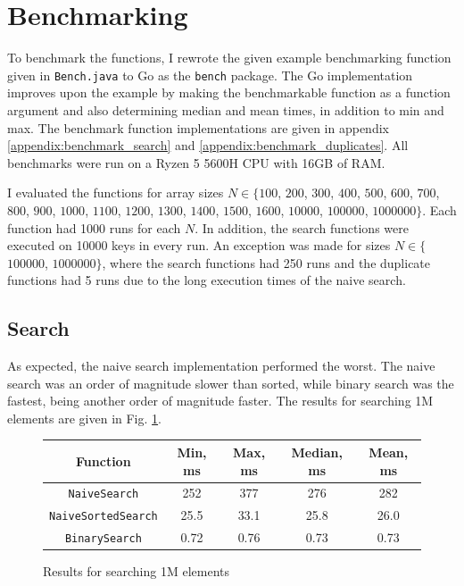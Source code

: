 \documentclass[a4paper,11pt]{article}
\begin{document}
    \section*{Benchmarking}

    To benchmark the functions, I rewrote the given example benchmarking function given in \texttt{Bench.java} to Go as the \texttt{bench} package. The Go implementation improves upon the example by making the benchmarkable function as a function argument and also determining median and mean times, in addition to min and max. The benchmark function implementations are given in appendix \ref{appendix:benchmark_search} and \ref{appendix:benchmark_duplicates}. All benchmarks were run on a Ryzen 5 5600H CPU with 16GB of RAM.

    I evaluated the functions for array sizes $N\in\{$$100$, $200$, $300$, $400$, $500$, $600$, $700$, $800$, $900$, $1000$, $1100$, $1200$, $1300$, $1400$, $1500$, $1600$, $10000$, $100000$, $1000000$$\}$. Each function had 1000 runs for each $N$. In addition, the search functions were executed on 10000 keys in every run. An exception was made for sizes $N\in\{$$100000$, $1000000$$\}$, where the search functions had 250 runs and the duplicate functions had 5 runs due to the long execution times of the naive search.

    \subsection*{Search}

    As expected, the naive search implementation performed the worst. The naive search was an order of magnitude slower than sorted, while binary search was the fastest, being another order of magnitude faster. The results for searching 1M elements are given in Fig. \ref{fig:search-n-1M}.

    \begin{figure}[H]
        \centering
        \begin{tabular}{c|c|c|c|c}
            Function & Min, ms & Max, ms & Median, ms & Mean, ms \\
            \hline
            \hline
            \texttt{NaiveSearch} & 252 & 377 & 276 & 282 \\
            \hline
            \texttt{NaiveSortedSearch} & 25.5 & 33.1 & 25.8 & 26.0 \\
            \hline
            \texttt{BinarySearch} & 0.72 & 0.76 & 0.73 & 0.73 \\
        \end{tabular}
        \caption{Results for searching 1M elements}
        \label{fig:search-n-1M}
    \end{figure}
\end{document}
